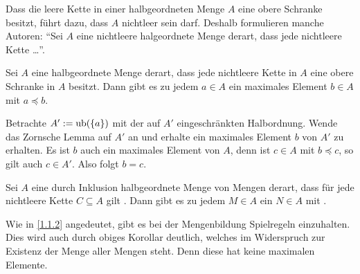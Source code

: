 \documentclass[../../main.tex]{subfiles}
\begin{document}
\begin{bem}\label{12.2.9}
Dass die leere Kette in einer halbgeordneten Menge $A$ eine obere Schranke besitzt, führt dazu, dass $A$ nichtleer sein darf. Deshalb formulieren manche Autoren: \enquote{Sei $A$ eine nichtleere halgeordnete Menge derart, dass jede nichtleere Kette \ldots}.
\end{bem}

\begin{kor}\label{12.2.10}
Sei $A$ eine halbgeordnete Menge derart, dass jede nichtleere Kette in $A$ eine obere Schranke in $A$ besitzt. Dann gibt es zu jedem $a\in A$ ein maximales Element $b\in A$ mit $a\preceq b$.
\end{kor}
\begin{cproof}
Betrachte $A':=\operatorname{ub}(\{a\})$ mit der auf $A'$ eingeschränkten Halbordnung. Wende das Zornsche Lemma auf $A'$ an und erhalte ein maximales Element $b$ von $A'$ zu erhalten. Es ist $b$ auch ein maximales Element von $A$, denn ist $c\in A$ mit $b\preceq c$, so gilt auch $c\in A'$. Also folgt $b=c$.
\end{cproof}

\begin{kor}\label{12.2.11}
Sei $A$ eine durch Inklusion halbgeordnete Menge von Mengen derart, dass für jede nichtleere Kette $C\subseteq A$ gilt . Dann gibt es zu jedem $M\in A$ ein  $N\in A$ mit .
\end{kor}

\begin{bem}\label{12.2.12}
Wie in \ref{1.1.2} angedeutet, gibt es bei der Mengenbildung Spielregeln einzuhalten. Dies wird auch durch obiges Korollar deutlich, welches im Widerspruch zur Existenz der Menge aller Mengen steht. Denn diese hat keine maximalen Elemente.
\end{bem}
\end{document}
